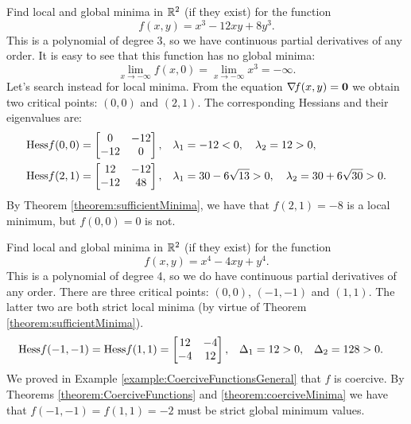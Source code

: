 \begin{example}
Find local and global minima in $\mathbb{R}^2$ (if they exist) for the function 
\begin{equation*}
f(x,y) = x^3-12xy+8y^3.
\end{equation*}
This is a polynomial of degree 3, so we have continuous partial derivatives of any order.  It is easy to see that this function has no global minima: 
\begin{equation*}
\lim_{x\to -\infty} f(x,0) = \lim_{x\to -\infty} x^3 = -\infty.
\end{equation*}
Let's search instead for local minima.  From the equation $\mathop{\nabla\! {f}}(x,y)=\boldsymbol{0}$ we obtain two critical points: $(0,0)$ and $(2,1)$.  The corresponding Hessians and their eigenvalues are:
\begin{align*}
\mathop{\mathrm{Hess}{f}}(0,0) &= \begin{bmatrix} 0 & -12 \\ -12 & 0 \end{bmatrix}, &\lambda_1 &=-12<0, \quad \lambda_2 =12>0 ,\\
\mathop{\mathrm{Hess}{f}}(2,1) &= \begin{bmatrix} 12 & -12 \\ -12 & 48 \end{bmatrix}, &\lambda_1 &= 30-6\sqrt{13}>0, \quad \lambda_2 = 30 + 6\sqrt{30}>0 .
\end{align*}
By Theorem \ref{theorem:sufficientMinima}, we have that $f(2,1)=-8$ is a local minimum, but $f(0,0)=0$ is not.
\end{example}

\begin{example}
Find local and global minima in $\mathbb{R}^2$ (if they exist) for the function
\begin{equation*}
f(x,y) = x^4-4xy+y^4.
\end{equation*}
This is a polynomial of degree 4, so we do have continuous partial derivatives of any order.  There are three critical points: $(0,0)$, $(-1,-1)$ and $(1,1)$.  The latter two are both strict local minima (by virtue of Theorem \ref{theorem:sufficientMinima}).
\begin{align*}
\mathop{\mathrm{Hess}{f}}(-1,-1) = \mathop{\mathrm{Hess}{f}}(1,1) &= \begin{bmatrix} 12 & -4 \\ -4 & 12 \end{bmatrix}, &\Delta_1 &= 12 > 0, & \Delta_2 &= 128 > 0.
\end{align*}
We proved in Example \ref{example:CoerciveFunctionsGeneral} that $f$ is coercive.  By Theorems \ref{theorem:CoerciveFunctions} and \ref{theorem:coerciveMinima} we have that $f(-1,-1)=f(1,1)=-2$ must be strict global minimum values.
\end{example}

